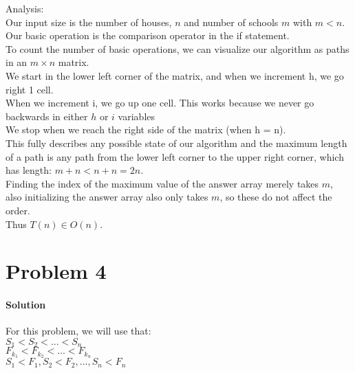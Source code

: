 \documentclass[12pt]{article}
\begin{document}
Analysis:
\\
Our input size is the number of houses, $n$ and number of schools $m$ with $m < n$.  
Our basic operation is the comparison operator in the if statement.\\
To count the number of basic operations, we can visualize our algorithm as paths in an $m \times n$ matrix.
\\
We start in the lower left corner of the matrix, and when we increment h, we go right 1 cell.\\
When we increment i, we go up one cell.  This works because we never go backwards in either $h$ or $i$ variables\\  
We stop when we reach the right side of the matrix (when h = n).\\
This fully describes any possible state of our algorithm and the maximum length of a path is any path from the lower left corner to the upper right
corner, which has length: $m +n < n + n = 2n$.\\
Finding the index of the maximum value of the answer array merely takes $m$, also initializing the answer array also only takes $m$, so these do not affect the
order.\\
Thus $T(n) \in O(n)$.

\section{Problem 4}
\paragraph{Solution}

For this problem, we will use that:\\
$S_1 < S_2 <... < S_n$\\
$F_{k_1} < F_{k_2} <... < F_{k_n}$\\
$S_1 < F_1, S_2 < F_2,..., S_n < F_n$\\
\end{document}
